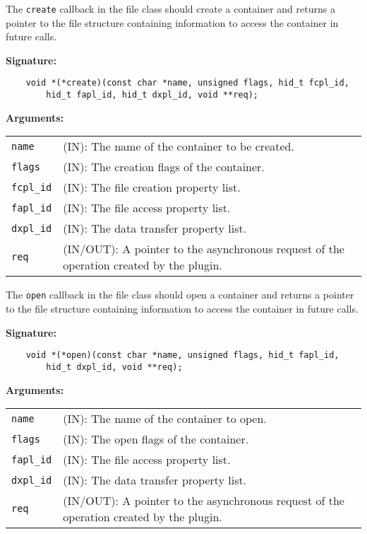 The {\tt create} callback in the file class should create a container
and returns a pointer to the file structure containing information to
access the container in future calls.

\textbf{Signature:}
\begin{lstlisting}
    void *(*create)(const char *name, unsigned flags, hid_t fcpl_id,
        hid_t fapl_id, hid_t dxpl_id, void **req);
\end{lstlisting}

\textbf{Arguments:}\\
\begin{tabular}{l p{10cm}}
  {\tt name} & (IN): The name of the container to be created.\\
  {\tt flags} & (IN): The creation flags of the container.\\
  {\tt fcpl\_id} & (IN): The file creation property list.\\
  {\tt fapl\_id} & (IN): The file access property list.\\
  {\tt dxpl\_id} & (IN): The data transfer property list.\\
  {\tt req} & (IN/OUT): A pointer to the asynchronous request of the
  operation created by the plugin.\\
\end{tabular}

The {\tt open} callback in the file class should open a container and
returns a pointer to the file structure containing information to
access the container in future calls.

\textbf{Signature:}
\begin{lstlisting}
    void *(*open)(const char *name, unsigned flags, hid_t fapl_id, 
        hid_t dxpl_id, void **req);
\end{lstlisting}

\textbf{Arguments:}\\
\begin{tabular}{l p{10cm}}
  {\tt name} & (IN): The name of the container to open.\\
  {\tt flags} & (IN): The open flags of the container.\\
  {\tt fapl\_id} & (IN): The file access property list.\\
  {\tt dxpl\_id} & (IN): The data transfer property list.\\
  {\tt req} & (IN/OUT): A pointer to the asynchronous request of the
  operation created by the plugin.\\
\end{tabular}

